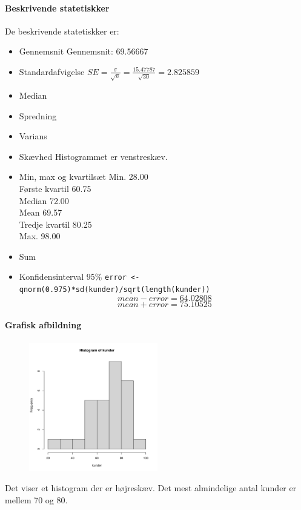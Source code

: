 \documentclass{article}
\begin{document}
\paragraph{Beskrivende statetiskker}
De beskrivende statetiskker er:
\begin{itemize}
  \item Gennemsnit
    \subitem Gennemsnit: 69.56667
  \item Standardafvigelse
    \subitem $SE = \frac{\sigma}{\sqrt{n}}= \frac{15.47787}{\sqrt{30}}  = 2.825859$
  \item Median
  \item Spredning
  \item Varians
  \item Skævhed
    \subitem Histogrammet er venstreskæv.
  \item Min, max og kvartilsæt
    \subitem Min. 28.00 \\
    Første kvartil 60.75 \\
    Median  72.00 \\
    Mean 69.57 \\  
    Tredje kvartil 80.25 \\ 
    Max.  98.00                                                 
  \item Sum
  \item Konfidensinterval 95\% 
    \subitem
 \lstinline|error <- qnorm(0.975)*sd(kunder)/sqrt(length(kunder))|
 $$mean-error =  64.02808$$
 $$mean+error = 75.10525$$
\end{itemize}

\paragraph{Grafisk afbildning}
\begin{figure}[H] 
  \centering
  \includegraphics[width=0.5\textwidth]{../velser/uge37/R/opg2plot.pdf}
\end{figure}
Det viser et histogram der er højreskæv. Det mest almindelige antal kunder er
mellem 70 og 80.
\end{document}
